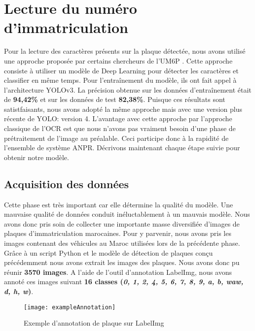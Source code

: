 \section{Lecture du numéro d'immatriculation}
Pour la lecture des caractères présents sur la plaque détectée, nous avons utilisé une approche proposée par certains chercheurs de l’UM6P \cite{Alahyane2021OpenDF}. Cette approche consiste à utiliser un modèle de Deep Learning pour détecter les caractères et classifier en même temps. Pour l’entraînement du modèle, ils ont fait appel à l’architecture YOLOv3. La précision obtenue sur les données d’entraînement était de \textbf{94,42\%} et sur les données de test \textbf{82,38\%}. Puisque ces résultats sont satistfaisants, nous avons adopté la même approche mais avec une version plus récente de YOLO: version 4. L'avantage avec cette approche par l'approche classique de l'OCR est que nous n'avons pas vraiment besoin d'une phase de prétraitement de l'image au préalable. Ceci participe donc à la rapidité de l'ensemble de système ANPR. Décrivons maintenant chaque étape suivie pour obtenir notre modèle.
    \subsection{Acquisition des données}
    Cette phase est très important car elle détermine la qualité du modèle. Une mauvaise qualité de données conduit inéluctablement à un mauvais modèle. Nous avons donc pris soin de collecter une importante masse diversifiée d’images de plaques d'immatriculation marocaines. Pour y parvenir, nous avons pris les images contenant des véhicules au Maroc utilisées lors de la précédente phase. Grâce à un script Python et le modèle de détection de plaques conçu précédemment nous avons extrait les images des plaques. Nous avons donc pu réunir \textbf{3570 images}. A l’aide de l’outil d’annotation LabelImg, nous avons annoté ces images suivant \textbf{16 classes (\textit{0, 1, 2, 4, 5, 6, 7, 8, 9, a, b, waw, d, h, w})}.
    \begin{figure}[H]
        \centering
        \texttt{[image: exampleAnnotation]}
        \caption{Exemple d'annotation de plaque sur LabelImg}
    \end{figure}
